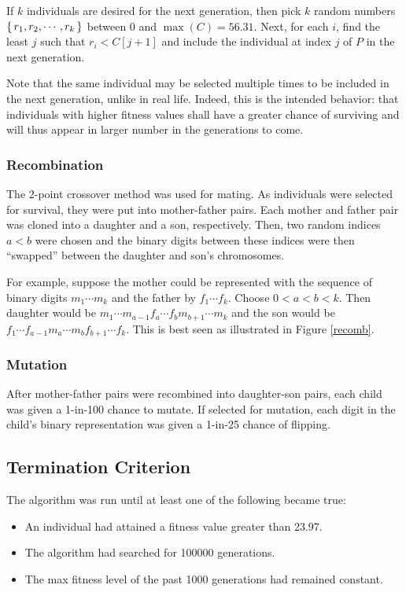 \documentclass{article}
\begin{document}
      If $k$ individuals are desired for the next generation, then pick $k$
      random numbers $\set{r_1,r_2,\cdots,r_k}$ between $0$ and $\max(C)=56.31$.
      Next, for each $i$, find the least $j$ such that $r_i < C[j+1]$ and
      include the individual at index $j$ of $P$ in the next generation.

      Note that the same individual may be selected multiple times to be
      included in the next generation, unlike in real life. Indeed, this is the
      intended behavior: that individuals with higher fitness values shall have
      a greater chance of surviving and will thus appear in larger number in the
      generations to come.

    \subsubsection{Recombination}
      The 2-point crossover method was used for mating. As individuals were
      selected for survival, they were put into mother-father pairs. Each
      mother and father pair was cloned into a daughter and a son, respectively.
      Then, two random indices $a<b$ were chosen and the binary digits between
      these indices were then ``swapped'' between the daughter and son's
      chromosomes.

      For example, suppose the mother could be represented with the
      sequence of binary digits $m_1\cdots m_k$ and the father by $f_1\cdots
      f_k$. Choose $0<a<b<k$. Then daughter would be $m_1\cdots m_{a-1}f_a\cdots
      f_bm_{b+1}\cdots m_k$ and the son would be $f_1\cdots f_{a-1}m_a\cdots m_b
      f_{b+1}\cdots f_k$. This is best seen as illustrated in Figure
      \ref{recomb}.
      

    \subsubsection{Mutation}
      After mother-father pairs were recombined into daughter-son pairs, each
      child was given a 1-in-100 chance to mutate. If selected for mutation,
      each digit in the child's binary representation was given a 1-in-25
      chance of flipping.

  \subsection{Termination Criterion}
    The algorithm was run until at least one of the following became true:
    \begin{itemize}
      \renewcommand\labelitemi{$\star$}
      \item{
        An individual had attained a fitness value greater than \num{23.97}.
      }
      \item{
        The algorithm had searched for \num{100000} generations.
      }
      \item{
        The max fitness level of the past \num{1000} generations had remained
        constant.
      }
    \end{itemize}
\end{document}
